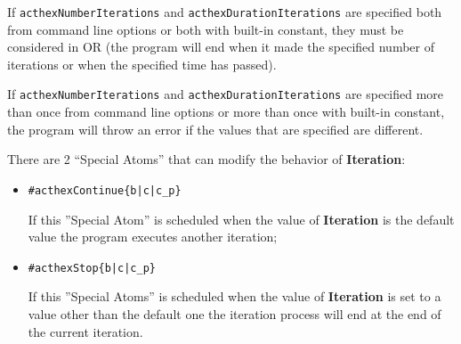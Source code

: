 \documentclass[a4paper, 11pt]{article}
\newcommand{\Iteration}{\textbf{Iteration}\xspace}
\begin{document}
		If \verb|acthexNumberIterations| and \verb|acthexDurationIterations| are specified both from command line options or both with built-in constant, they must be considered in OR (the program will end when it made ​​the specified number of iterations or when the specified time has passed).

		If \verb|acthexNumberIterations| and \verb|acthexDurationIterations| are specified more than once from command line options or more than once with built-in constant, the program will throw an error if the values that are specified are different.

		\vspace*{1em}

		There are 2 ``Special Atoms'' that can modify the behavior of \Iteration:
		\begin{itemize}
			\item \verb+#acthexContinue{b|c|c_p}+

				If this ''Special Atom'' is scheduled when the value of \Iteration is the default value the program executes another iteration;

			\item \verb+#acthexStop{b|c|c_p}+

				If this ''Special Atoms'' is scheduled when the value of \Iteration is set to a value other than the default one the iteration process will end at the end of the current iteration.
		\end{itemize}
\end{document}
